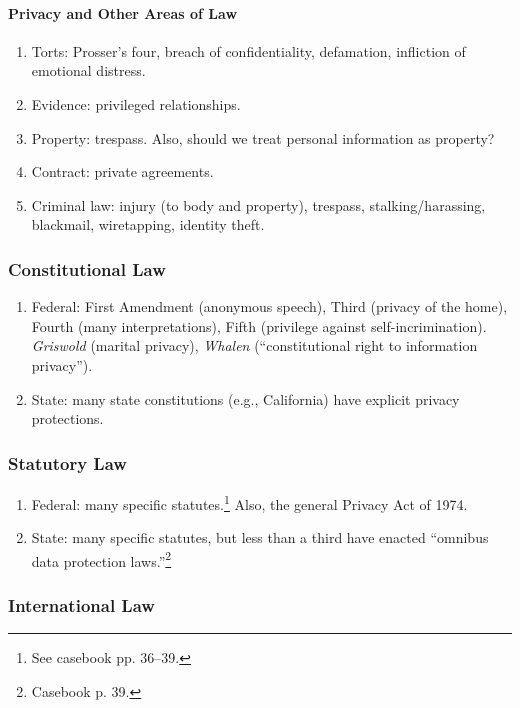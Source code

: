 \paragraph{Privacy and Other Areas of Law}

\begin{enumerate}
    \item Torts: Prosser's four, breach of confidentiality, defamation, 
    infliction of emotional distress.
    \item Evidence: privileged relationships.
    \item Property: trespass. Also, should we treat personal information as 
    property?
    \item Contract: private agreements.
    \item Criminal law: injury (to body and property), trespass, 
    stalking/harassing, blackmail, wiretapping, identity theft.
\end{enumerate}

\subsubsection{Constitutional Law}

\begin{enumerate}
    \item Federal: First Amendment (anonymous speech), Third (privacy of the 
    home), Fourth (many interpretations), Fifth (privilege against 
    self-incrimination). \emph{Griswold} (marital privacy), \emph{Whalen} 
    (``constitutional right to information privacy'').
    \item State: many state constitutions (e.g., California) have explicit 
    privacy protections.
\end{enumerate}

\subsubsection{Statutory Law}

\begin{enumerate}
    \item Federal: many specific statutes.\footnote{See casebook pp. 36--39.} 
    Also, the general Privacy Act of 1974.
    \item State: many specific statutes, but less than a third have enacted 
    ``omnibus data protection laws.''\footnote{Casebook p. 39.}
\end{enumerate}

\subsubsection{International Law}

